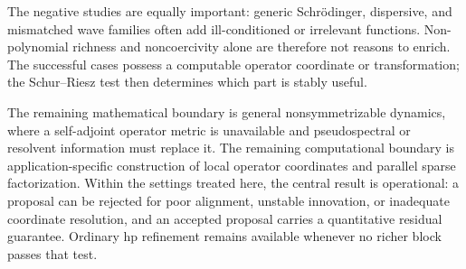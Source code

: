 \documentclass[11pt]{article}
\numberwithin{algorithm}{section}
\theoremstyle{definition}\newtheorem{definition}[theorem]{Definition}
\theoremstyle{remark}\newtheorem{remark}[theorem]{Remark}
\begin{document}
The negative studies are equally important: generic Schr\"odinger,
dispersive, and mismatched wave families often add ill-conditioned or
irrelevant functions.  Non-polynomial richness and noncoercivity alone are
therefore not reasons to enrich.  The successful cases possess a computable
operator coordinate or transformation; the Schur--Riesz test then determines
which part is stably useful.

The remaining mathematical boundary is general nonsymmetrizable dynamics,
where a self-adjoint operator metric is unavailable and pseudospectral or
resolvent information must replace it.  The remaining computational boundary
is application-specific construction of local operator coordinates and
parallel sparse factorization.  Within the settings treated here, the central
result is operational: a proposal can be rejected for poor alignment,
unstable innovation, or inadequate coordinate resolution, and an accepted
proposal carries a quantitative residual guarantee.  Ordinary hp refinement
remains available whenever no richer block passes that test.
\fi
\end{document}
